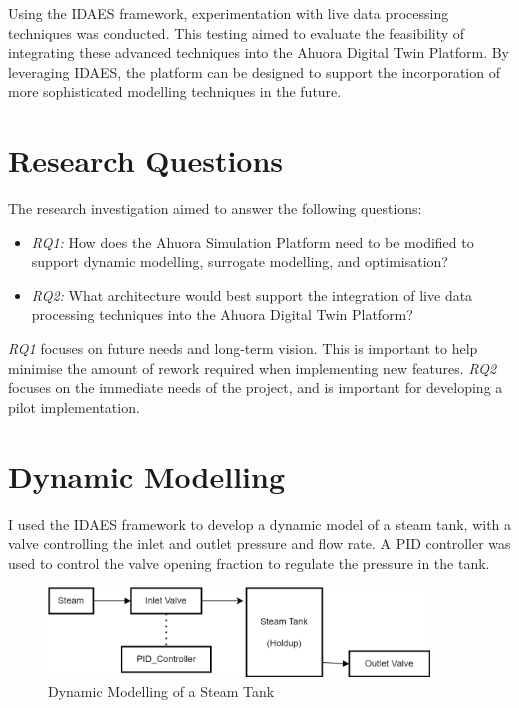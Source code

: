 \documentclass[12pt]{report}
\begin{document}
Using the IDAES framework, experimentation with live data processing techniques was conducted. This testing aimed to evaluate the feasibility of integrating these advanced techniques into the Ahuora Digital Twin Platform. By leveraging IDAES, the platform can be designed to support the incorporation of more sophisticated modelling techniques in the future.

\section{Research Questions}

The research investigation aimed to answer the following questions:

\begin{itemize}
    \item \textit{RQ1:} How does the Ahuora Simulation Platform need to be modified to support dynamic modelling, surrogate modelling, and optimisation?
    \item \textit{RQ2:} What architecture would best support the integration of live data processing techniques into the Ahuora Digital Twin Platform?
\end{itemize}

\textit{RQ1} focuses on future needs and long-term vision. This is important to help minimise the amount of rework required when implementing new features. \textit{RQ2} focuses on the immediate needs of the project, and is important for developing a pilot implementation.

\section{Dynamic Modelling}

I used the IDAES framework to develop a dynamic model of a steam tank, with a valve controlling the inlet and outlet pressure and flow rate. A PID controller was used to control the valve opening fraction to regulate the pressure in the tank.

\begin{figure}
    \includegraphics[width=0.9\textwidth]{dynamicmodelling.png}
    \caption{Dynamic Modelling of a Steam Tank}
    \label{fig:dynamicmodelling}
\end{figure}
\end{document}

